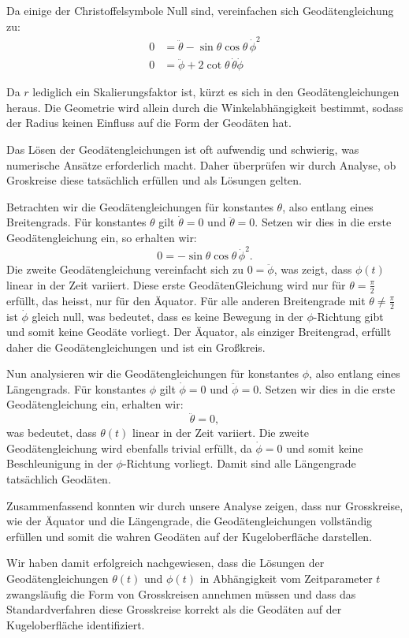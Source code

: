 Da einige der Christoffelsymbole Null sind, vereinfachen sich Geodätengleichung zu:
\begin{align}
	0 &= \ddot{\theta} - \sin\theta \cos\theta \, \dot{\phi}^2 \\
	0 &= \ddot{\phi} + 2 \cot\theta \, \dot{\theta} \dot{\phi}
\end{align}

Da $r$ lediglich ein Skalierungsfaktor ist, kürzt es sich in den Geodätengleichungen heraus. 
Die Geometrie wird allein durch die Winkelabhängigkeit bestimmt, sodass der Radius keinen Einfluss auf die Form der Geodäten hat.

Das Lösen der Geodätengleichungen ist oft aufwendig und schwierig, was numerische Ansätze erforderlich macht. 
Daher überprüfen wir durch Analyse, ob Groskreise diese tatsächlich erfüllen und als Lösungen gelten.

Betrachten wir die Geodätengleichungen für konstantes $\theta$, also entlang eines Breitengrads.
Für konstantes $\theta$ gilt $\dot{\theta} = 0$ und $\ddot{\theta} = 0$.
Setzen wir dies in die erste Geodätengleichung ein, so erhalten wir:
\begin{equation}
	0 = -\sin\theta \cos\theta \, \dot{\phi}^2.
\end{equation}
Die zweite Geodätengleichung vereinfacht sich zu $0 = \ddot{\phi}$, was zeigt, dass $\phi(t)$ linear in der Zeit variiert.
Diese erste GeodätenGleichung wird nur für $\theta = \frac{\pi}{2}$ erfüllt, das heisst, nur für den Äquator.
Für alle anderen Breitengrade mit $\theta \neq \frac{\pi}{2}$ ist $\dot{\phi}$ gleich null, was bedeutet, dass es keine Bewegung in der $\phi$-Richtung gibt und somit keine Geodäte vorliegt.
Der Äquator, als einziger Breitengrad, erfüllt daher die Geodätengleichungen und ist ein Großkreis.

Nun analysieren wir die Geodätengleichungen für konstantes $\phi$, also entlang eines Längengrads.
Für konstantes $\phi$ gilt $\dot{\phi} = 0$ und $\ddot{\phi} = 0$.
Setzen wir dies in die erste Geodätengleichung ein, erhalten wir:
\begin{equation}
	\ddot{\theta} = 0,
\end{equation}
was bedeutet, dass $\theta(t)$ linear in der Zeit variiert.
Die zweite Geodätengleichung wird ebenfalls trivial erfüllt, da $\dot{\phi} = 0$ und somit keine Beschleunigung in der $\phi$-Richtung vorliegt.
Damit sind alle Längengrade tatsächlich Geodäten.

Zusammenfassend konnten wir durch unsere Analyse zeigen, dass nur Grosskreise, wie der Äquator und die Längengrade, die Geodätengleichungen vollständig erfüllen und somit die wahren Geodäten auf der Kugeloberfläche darstellen.

Wir haben damit erfolgreich nachgewiesen, dass die Lösungen der Geodätengleichungen $\theta(t)$ und $\phi(t)$ in Abhängigkeit vom Zeitparameter $t$ zwangsläufig die Form von Grosskreisen annehmen müssen und dass das Standardverfahren diese Grosskreise korrekt als die Geodäten auf der Kugeloberfläche identifiziert.


